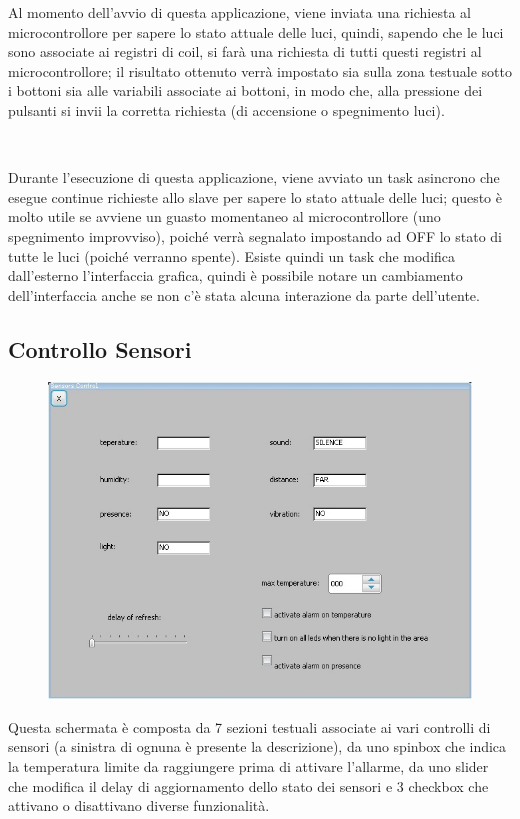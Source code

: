 \documentclass[a4paper,titlepage]{book}
\begin{document}
Al momento dell'avvio di questa applicazione, viene inviata una richiesta al microcontrollore per sapere lo stato attuale delle luci, quindi, sapendo che le luci sono associate ai registri di coil, si farà una richiesta di tutti questi registri al microcontrollore; il risultato ottenuto verrà impostato sia sulla zona testuale sotto i bottoni sia alle variabili associate ai bottoni, in modo che, alla pressione dei pulsanti si invii la corretta richiesta (di accensione o spegnimento luci).

~

Durante l'esecuzione di questa applicazione, viene avviato un task asincrono che esegue continue richieste allo slave per sapere lo stato attuale delle luci; questo è molto utile se avviene un guasto momentaneo al microcontrollore (uno spegnimento improvviso), poiché verrà segnalato impostando ad OFF lo stato di tutte le luci (poiché verranno spente). Esiste quindi un task che modifica dall'esterno l'interfaccia grafica, quindi è possibile notare un cambiamento dell'interfaccia anche se non c'è stata alcuna interazione da parte dell'utente.


\newpage
\subsection{Controllo Sensori}

\begin{figure}[!h]
\centering
\includegraphics[scale=0.6]{sensorgui.jpg}
\end{figure}

Questa schermata è composta da 7 sezioni testuali associate ai vari controlli di sensori (a sinistra di ognuna è presente la descrizione), da uno spinbox che indica la temperatura limite da raggiungere prima di attivare l'allarme, da uno slider che modifica il delay di aggiornamento dello stato dei sensori e 3 checkbox che attivano o disattivano diverse funzionalità.
\end{document}

